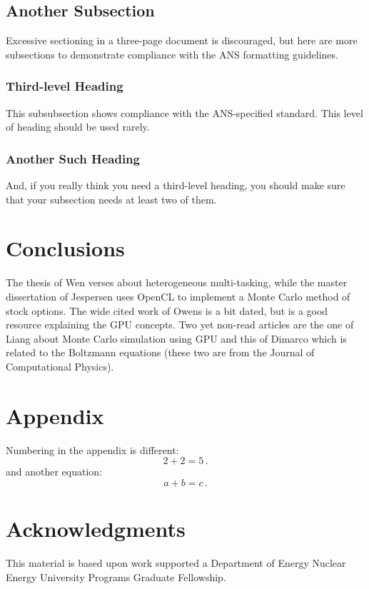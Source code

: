 \documentclass[twoside,a4paper,12pt,english,draft]{anstrans}
\begin{document}
\subsection{Another Subsection}
Excessive sectioning in a three-page document is discouraged, but here are more
subsections to demonstrate compliance with the ANS formatting guidelines.

\subsubsection{Third-level Heading}
This subsubsection shows compliance with the ANS-specified standard. This level
of heading should be used rarely.

\subsubsection{Another Such Heading}
And, if you really think you need a third-level heading, you should make sure
that your subsection needs at least two of them.

\section{Conclusions}

The thesis of Wen \cite{Wen2017} verses about heterogeneous multi-tasking, while
the master dissertation of Jespersen \cite{Jespersen2015} uses OpenCL to implement
a Monte Carlo method of stock options. The wide cited work of Owens \cite{Owens2007}
is a bit dated, but is a good resource explaining the GPU concepts. Two yet non-read articles
are the one of Liang \cite{Liang2017} about Monte Carlo simulation using GPU and this of Dimarco
\cite{Dimarco2017} which is related to the Boltzmann equations (these two are from the Journal
of Computational Physics).

\appendix
\section{Appendix}

Numbering in the appendix is different:
\begin{equation} \label{eq:appendix}
  2 + 2 = 5\,.
\end{equation}
and another equation:
\begin{equation} \label{eq:appendix2}
  a + b = c\,.
\end{equation}

\section{Acknowledgments}
This material is based upon work supported a Department of Energy Nuclear
Energy University Programs Graduate Fellowship.


\end{document}
